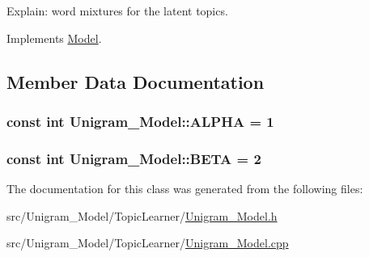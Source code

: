 Explain: word mixtures for the latent topics. 



Implements \hyperlink{class_model_a166812818e0039417ddeeb661c8bafec}{Model}.



\subsection{Member Data Documentation}
\hypertarget{class_unigram___model_aa5cba2e31940356b03895c5ff509ea4e}{
\subsubsection[{ALPHA}]{\setlength{\rightskip}{0pt plus 5cm}const int {\bf Unigram\_\-Model::ALPHA} = 1}}
\label{class_unigram___model_aa5cba2e31940356b03895c5ff509ea4e}
\hypertarget{class_unigram___model_a863bfe2570e8033eec42004a9b4239f8}{
\subsubsection[{BETA}]{\setlength{\rightskip}{0pt plus 5cm}const int {\bf Unigram\_\-Model::BETA} = 2}}
\label{class_unigram___model_a863bfe2570e8033eec42004a9b4239f8}


The documentation for this class was generated from the following files:\begin{DoxyCompactItemize}
\item 
src/Unigram\_\-Model/TopicLearner/\hyperlink{_unigram___model_8h}{Unigram\_\-Model.h}\item 
src/Unigram\_\-Model/TopicLearner/\hyperlink{_unigram___model_8cpp}{Unigram\_\-Model.cpp}\end{DoxyCompactItemize}
